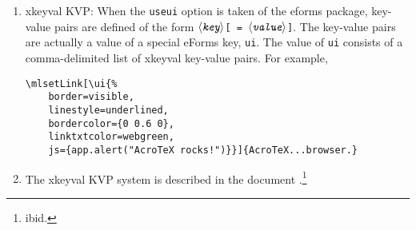 \documentclass{article}
\makeatletter
\def\amtIndent{15pt}
\def\anglemeta#1{$\langle\textit{\texttt{#1}}\rangle$}
\let\pkg\textsf
\let\opt\texttt
\def\cs#1{\texttt{\@backslashchar#1}}
\makeatother
\begin{document}
\begin{enumerate}
    \item \pkg{xkeyval} KVP: When the \opt{useui} option is taken of the eforms package, key-value pairs are
        defined of the form \texttt{\anglemeta{key}[\,=\,\anglemeta{value}]}. The key-value pairs are actually a value of
        a special eForms key, \cs{ui}. The value of \cs{ui} consists of a comma-delimited list of
        \pkg{xkeyval} key-value pairs. For example,
\begin{Verbatim}[xleftmargin=\amtIndent,fontsize=\small]
\mlsetLink[\ui{%
    border=visible,
    linestyle=underlined,
    bordercolor={0 0.6 0},
    linktxtcolor=webgreen,
    js={app.alert("AcroTeX rocks!")}}]{AcroTeX...browser.}
\end{Verbatim}
    \item[] The \pkg{xkeyval} KVP system is described in the document
    \textsl{}.\footnote
    {ibid.}
\end{enumerate}
\end{document}
